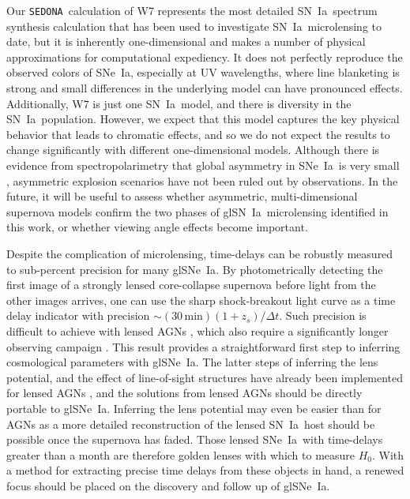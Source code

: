 \documentclass[iop,apj,numberedappendix,twocolappendix]{emulateapj}
\newcommand{\snia}{{\rm SN~Ia}}
\newcommand{\sneia}{{\rm SNe~Ia}}
\newcommand{\MCcode}{\texttt{SEDONA}}
\begin{document}
Our \MCcode\ calculation of W7 represents the most detailed \snia\ spectrum synthesis calculation that has been used to investigate \snia\ microlensing to date, but it is inherently one-dimensional and makes a number of physical approximations for computational expediency.
It does not perfectly reproduce the observed colors of \sneia, especially at UV wavelengths, where line blanketing is strong and small differences in the underlying model can have pronounced effects.
Additionally, W7 is just one \snia\ model, and there is diversity in the \snia\ population.
However, we expect that this model captures the key physical behavior that leads to chromatic effects, and so we do not expect the results to change significantly with different one-dimensional models.
Although there is evidence from spectropolarimetry that global asymmetry in \sneia\ is very small \citep{specpol}, asymmetric explosion scenarios have not been ruled out by observations. 
In the future, it will be useful to assess whether asymmetric, multi-dimensional supernova models confirm the two phases of gl\snia\ microlensing identified in this work, or whether viewing angle effects become important.


Despite the complication of microlensing, time-delays can be robustly measured to sub-percent precision for many gl\sneia. 
By photometrically detecting the first image of a strongly lensed core-collapse supernova before light from the other images arrives, one can use the sharp shock-breakout light curve as a time delay indicator with precision $\sim$$(30\,\mathrm{min})(1+z_s) / \Delta t$.  
Such precision is difficult to achieve with lensed AGNs \citep{tewes13,bonvin17,tk17}, which also require a significantly longer observing campaign \citep{tdc}. 
This result provides a straightforward first step to inferring cosmological parameters with gl\sneia.
The latter steps of inferring the lens potential, and the effect of line-of-sight structures have already been implemented for lensed AGNs \citep[e.g.][]{suyu17,rusu17,wong17,bonvin17}, and the solutions from lensed AGNs should be directly portable to gl\sneia. 
Inferring the lens potential may even be easier than for AGNs as a more detailed reconstruction of the lensed \snia\ host should be possible once the supernova has faded. 
Those lensed \sneia\ with time-delays greater than a month are therefore golden lenses with which to measure $H_0$.
With a method for extracting precise time delays from these objects in hand, a renewed focus should be placed on the discovery and follow up of gl\sneia.
\end{document}
